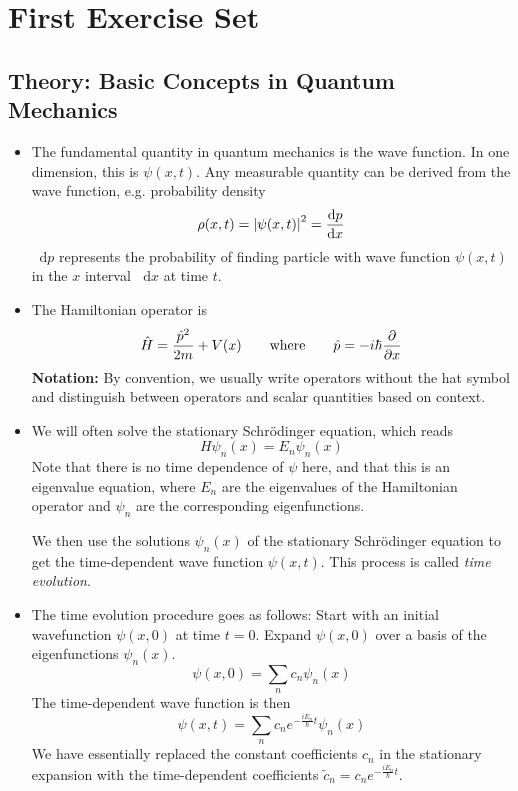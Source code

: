 \documentclass[11pt, a4paper]{article}
\newcommand{\diff}{\mathop{}\!\mathrm{d}} %
\newcommand{\eqtext}[1]{\qquad \text{#1} \qquad}
\newcommand{\Schro}{Schr\"{o}dinger\xspace}
\renewcommand{\op}[1]{\hat{#1}} %
\begin{document}
\newpage

\section{First Exercise Set}

\subsection{Theory: Basic Concepts in Quantum Mechanics}
\begin{itemize}
	\item The fundamental quantity in quantum mechanics is the wave function. In one dimension, this is $ \psi(x, t) $. Any measurable quantity can be derived from the wave function, e.g. probability density
	\begin{equation*}
		\rho(x, t) = \abs{\psi(x, t)}^{2} = \dv{p}{x}
	\end{equation*}
	$ \diff p $ represents the probability of finding particle with wave function $ \psi(x, t) $ in the $ x $ interval $ \diff x $ at time $ t $. 
		
	\item The Hamiltonian operator is
	\begin{equation*}
		\op{H} = \frac{\op{p}^{2}}{2m} + V(x) \eqtext{where} \op{p} = - i\hbar \pdv{}{x}
	\end{equation*}
	\textbf{Notation:} By convention, we usually write operators without the hat symbol and distinguish between operators and scalar quantities based on context.
	
	\item We will often solve the stationary \Schro equation, which reads
	\begin{equation*}
		H\psi_{n}(x) = E_{n}\psi_{n}(x)
	\end{equation*}
	Note that there is no time dependence of $ \psi $ here, and that this is an eigenvalue equation, where $ E_{n} $ are the eigenvalues of the Hamiltonian operator and $ \psi_{n} $ are the corresponding eigenfunctions.
	
	We then use the solutions $ \psi_{n}(x) $ of the stationary \Schro equation to get the time-dependent wave function $ \psi(x, t) $. This process is called \textit{time evolution}. 
	
	\item The time evolution procedure goes as follows: Start with an initial wavefunction $ \psi(x, 0) $ at time $ t = 0 $. Expand $ \psi(x, 0) $ over a basis of the eigenfunctions $ \psi_{n}(x) $.
	\begin{equation*}
		\psi(x, 0) = \sum_{n} c_{n} \psi_{n}(x)
	\end{equation*}
	The time-dependent wave function is then
	\begin{equation*}
		\psi(x, t) = \sum_{n} c_{n}e^{-\frac{iE_{n}}{\hbar}t}\psi_{n}(x)
	\end{equation*}
	We have essentially replaced the constant coefficients $ c_{n} $ in the stationary expansion with the time-dependent coefficients $ \tilde{c}_{n} = c_{n}e^{-\frac{iE_{n}}{\hbar}t} $.
	

\end{itemize}
\end{document}
